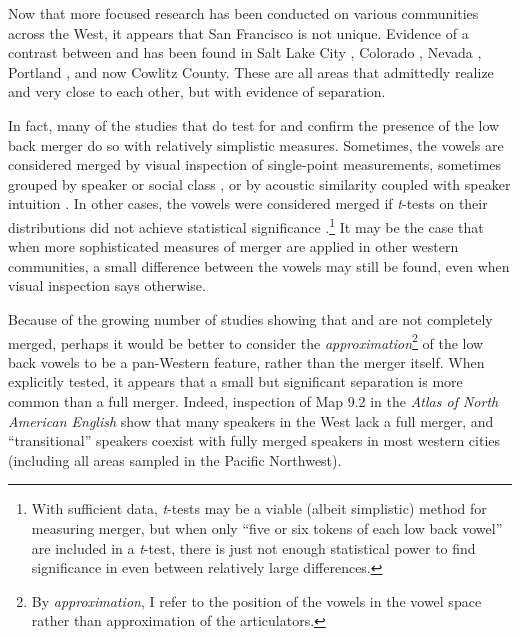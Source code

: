 Now that more focused research has been conducted on various communities across the West, it appears that San Francisco is not unique. Evidence of a contrast between \lot and \thought has been found in Salt Lake City \citep{dipaolo_1992}, Colorado \citep{holland_brandenburg_2017_pads}, Nevada \citep{fridland_kendall_2017_pads}, Portland \citep{becker_etal_2016_pads}, and now Cowlitz County. These are all areas that admittedly realize \lot and \thought very close to each other, but with evidence of separation.

In fact, many of the studies that do test for and confirm the presence of the low back merger do so with relatively simplistic measures. Sometimes, the vowels are considered merged by visual inspection of single-point measurements, sometimes grouped by speaker or social class \citep{brumbaugh_koops_2017_pads, kennedy_grama_2012, wassink_2015}, or by acoustic similarity coupled with speaker intuition \citep[59]{labov_ash_boberg_2006_anae}. In other cases, the vowels were considered merged if \textit{t}-tests on their distributions did not achieve statistical significance \citep{bar_el_etal_2017}.\footnote{With sufficient data, \textit{t}-tests may be a viable (albeit simplistic) method for measuring merger, but when only ``five or six tokens of each low back vowel'' \citep[122]{bar_el_etal_2017} are included in a \textit{t}-test, there is just not enough statistical power to find significance in even between relatively large differences.} It may be the case that when more sophisticated measures of merger are applied in other western communities, a small difference between the vowels may still be found, even when visual inspection says otherwise.

Because of the growing number of studies showing that \lot and \thought are not completely merged, perhaps it would be better to consider the \textit{approximation}\footnote{By \textit{approximation}, I refer to the position of the vowels in the vowel space rather than approximation of the articulators.} of the low back vowels to be a pan-Western feature, rather than the merger itself. When explicitly tested, it appears that a small but significant separation is more common than a full merger. Indeed, inspection of Map 9.2 in the \textit{Atlas of North American English} show that many speakers in the West lack a full merger, and ``transitional'' speakers coexist with fully merged speakers in most western cities (including all areas sampled in the Pacific Northwest).

